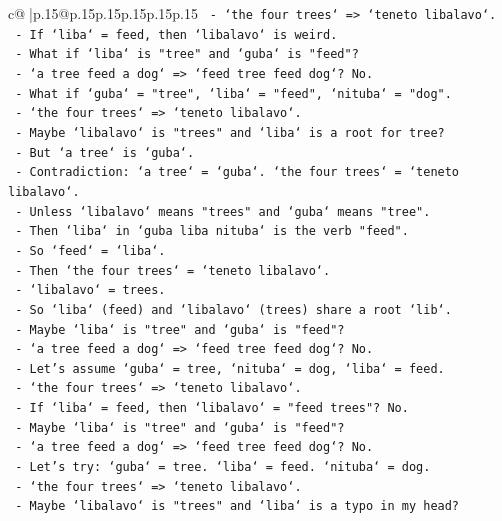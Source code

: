 \documentclass{article}
\begin{document}
{\begin{supertabular}{c@{$\;$}|p{.15\linewidth}@{}p{.15\linewidth}p{.15\linewidth}p{.15\linewidth}p{.15\linewidth}p{.15\linewidth}}
{{{\texttt{  {-} `the four trees` => `teneto libalavo`.} \\
\texttt{  {-} If `liba` = feed, then `libalavo` is weird.} \\
\texttt{  {-} What if `liba` is "tree" and `guba` is "feed"?} \\
\texttt{  {-} `a tree feed a dog` => `feed tree feed dog`? No.} \\
\texttt{  {-} What if `guba` = "tree", `liba` = "feed", `nituba` = "dog".} \\
\texttt{  {-} `the four trees` => `teneto libalavo`.} \\
\texttt{  {-} Maybe `libalavo` is "trees" and `liba` is a root for tree?} \\
\texttt{  {-} But `a tree` is `guba`.} \\
\texttt{  {-} Contradiction: `a tree` = `guba`. `the four trees` = `teneto libalavo`.} \\
\texttt{  {-} Unless `libalavo` means "trees" and `guba` means "tree".} \\
\texttt{  {-} Then `liba` in `guba liba nituba` is the verb "feed".} \\
\texttt{  {-} So `feed` = `liba`.} \\
\texttt{  {-} Then `the four trees` = `teneto libalavo`.} \\
\texttt{  {-} `libalavo` = trees.} \\
\texttt{  {-} So `liba` (feed) and `libalavo` (trees) share a root `lib`.} \\
\texttt{  {-} Maybe `liba` is "tree" and `guba` is "feed"?} \\
\texttt{  {-} `a tree feed a dog` => `feed tree feed dog`? No.} \\
\texttt{  {-} Let's assume `guba` = tree, `nituba` = dog, `liba` = feed.} \\
\texttt{  {-} `the four trees` => `teneto libalavo`.} \\
\texttt{  {-} If `liba` = feed, then `libalavo` = "feed trees"? No.} \\
\texttt{  {-} Maybe `liba` is "tree" and `guba` is "feed"?} \\
\texttt{  {-} `a tree feed a dog` => `feed tree feed dog`? No.} \\
\texttt{  {-} Let's try: `guba` = tree. `liba` = feed. `nituba` = dog.} \\
\texttt{  {-} `the four trees` => `teneto libalavo`.} \\
\texttt{  {-} Maybe `libalavo` is "trees" and `liba` is a typo in my head?} \\
}}}
\end{supertabular}}
\end{document}
